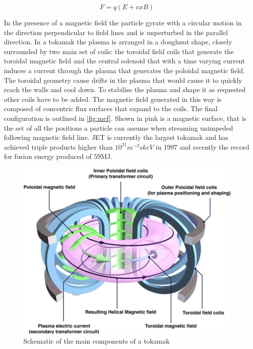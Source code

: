 \begin{equation}
F = q ( E+ vxB )
\label{eq:lorentz}
\end{equation}

In the presence of a magnetic field the particle gyrate with a circular motion in the direction perpendicular to field lines and is unperturbed in the parallel direction. In a tokamak the plasma is arranged in a doughnut shape, closely surrounded by two main set of coils: the toroidal field coils that generate the toroidal magnetic field and the central solenoid that with a time varying current induces a current through the plasma that generates the poloidal magnetic field. The toroidal geometry cause drifts in the plasma that would cause it to quickly reach the walls and cool down. To stabilise the plasma and shape it as requested other coils have to be added.\cite{Chen1974} The magnetic field generated in this way is composed of concentric flux surfaces that expand to the coils. The final configuration is outlined in \autoref{fig:mcf}. Shown in pink is a magnetic surface, that is the set of all the positions a particle can assume when streaming unimpeded following magnetic field line. JET is currently the largest tokamak and has achieved triple products higher than $10^{21} m^{-3}skeV$ in 1997 \cite{Gormezano1998} and recently the record for fusion energy produced of 59MJ. \cite{Gibney2022}

\begin{figure}[!ht]
	\centering
	\includegraphics[width=0.7\linewidth]{Chapters/chapter1/figs/mcf.png}
	\caption{Schematic of the main components of a tokamak \cite{CulhamCentreforFusionEnergy2018}}
	\label{fig:mcf}
\end{figure}

